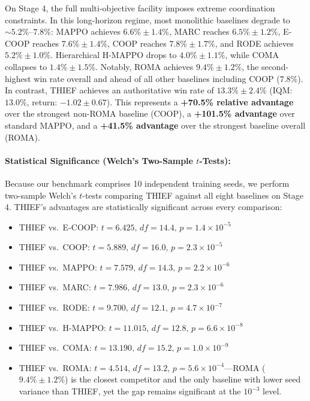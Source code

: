 On Stage 4, the full multi-objective facility imposes extreme coordination constraints. In this long-horizon regime, most monolithic baselines degrade to $\sim 5.2\%$--$7.8\%$: MAPPO achieves $6.6\% \pm 1.4\%$, MARC reaches $6.5\% \pm 1.2\%$, E-COOP reaches $7.6\% \pm 1.4\%$, COOP reaches $7.8\% \pm 1.7\%$, and RODE achieves $5.2\% \pm 1.0\%$. Hierarchical H-MAPPO drops to $4.0\% \pm 1.1\%$, while COMA collapses to $1.4\% \pm 1.5\%$. Notably, ROMA achieves $9.4\% \pm 1.2\%$, the second-highest win rate overall and ahead of all other baselines including COOP ($7.8\%$). In contrast, THIEF achieves an authoritative win rate of \textbf{$13.3\% \pm 2.4\%$} (IQM: $13.0\%$, return: $-1.02 \pm 0.67$). This represents a \textbf{+70.5\% relative advantage} over the strongest non-ROMA baseline (COOP), a \textbf{+101.5\% advantage} over standard MAPPO, and a \textbf{+41.5\% advantage} over the strongest baseline overall (ROMA).

\paragraph{Statistical Significance (Welch's Two-Sample $t$-Tests):}
Because our benchmark comprises 10 independent training seeds, we perform two-sample Welch's $t$-tests comparing THIEF against all eight baselines on Stage 4. THIEF's advantages are statistically significant across every comparison:
\begin{itemize}[leftmargin=*,nosep]
    \item THIEF vs.\ E-COOP: $t = 6.425, \, df = 14.4, \, p = 1.4 \times 10^{-5}$
    \item THIEF vs.\ COOP: $t = 5.889, \, df = 16.0, \, p = 2.3 \times 10^{-5}$
    \item THIEF vs.\ MAPPO: $t = 7.579, \, df = 14.3, \, p = 2.2 \times 10^{-6}$
    \item THIEF vs.\ MARC: $t = 7.986, \, df = 13.0, \, p = 2.3 \times 10^{-6}$
    \item THIEF vs.\ RODE: $t = 9.700, \, df = 12.1, \, p = 4.7 \times 10^{-7}$
    \item THIEF vs.\ H-MAPPO: $t = 11.015, \, df = 12.8, \, p = 6.6 \times 10^{-8}$
    \item THIEF vs.\ COMA: $t = 13.190, \, df = 15.2, \, p = 1.0 \times 10^{-9}$
    \item THIEF vs.\ ROMA: $t = 4.514, \, df = 13.2, \, p = 5.6 \times 10^{-4}$---ROMA ($9.4\% \pm 1.2\%$) is the closest competitor and the only baseline with lower seed variance than THIEF, yet the gap remains significant at the $10^{-3}$ level.
\end{itemize}

